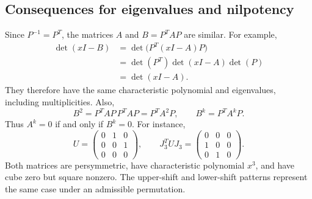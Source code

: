 \documentclass[11pt,a4paper]{article}
\begin{document}
\subsection{Consequences for eigenvalues and nilpotency}
Since $P^{-1}=P^T$, the matrices $A$ and $B=P^TAP$ are similar. For example,
\begin{align*}
 \det(xI-B)
 &=\det\bigl(P^T(xI-A)P\bigr)\\
 &=\det(P^T)\det(xI-A)\det(P)\\
 &=\det(xI-A).
\end{align*}
They therefore have the same characteristic polynomial and eigenvalues,
including multiplicities. Also,
\[
 B^2=P^TAP\,P^TAP=P^TA^2P,
 \qquad B^k=P^TA^kP.
\]
Thus $A^k=0$ if and only if $B^k=0$. For instance,
\[
 U=\begin{pmatrix}0&1&0\\0&0&1\\0&0&0\end{pmatrix},
 \qquad J_3^TUJ_3=
 \begin{pmatrix}0&0&0\\1&0&0\\0&1&0\end{pmatrix}.
\]
Both matrices are persymmetric, have characteristic polynomial $x^3$, and
have cube zero but square nonzero. The upper-shift and lower-shift patterns
represent the same case under an admissible permutation.


\begingroup
\raggedright

\endgroup
\end{document}
